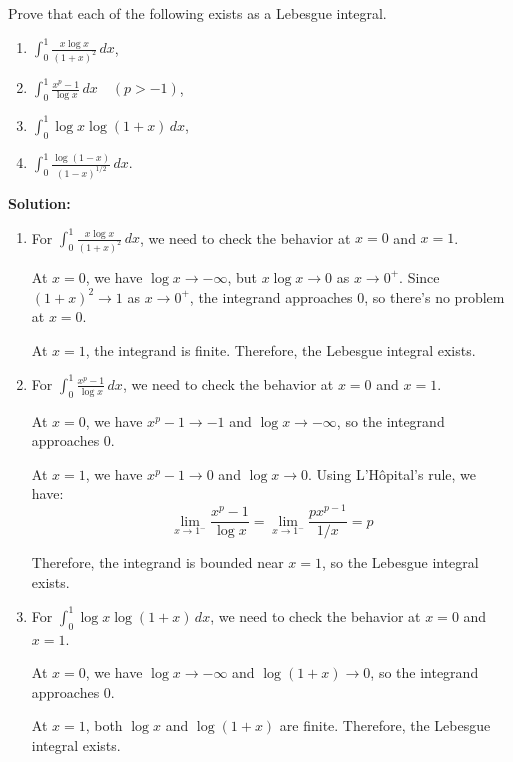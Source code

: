 \begin{problembox}
Prove that each of the following exists as a Lebesgue integral.
\begin{enumerate}[label=(\alph*)]
    \item $\int_{0}^{1} \frac{x \log x}{(1 + x)^2} \, dx$,
    \item $\int_{0}^{1} \frac{x^p - 1}{\log x} \, dx \quad (p > -1)$,
    \item $\int_{0}^{1} \log x \log (1 + x) \, dx$,
    \item $\int_{0}^{1} \frac{\log (1 - x)}{(1 - x)^{1/2}} \, dx.$
\end{enumerate}
\end{problembox}

\bigskip\noindent\textbf{Solution:}
\begin{enumerate}[label=(\alph*)]
    \item For $\int_{0}^{1} \frac{x \log x}{(1 + x)^2} \, dx$, we need to check the behavior at $x = 0$ and $x = 1$.
    
    At $x = 0$, we have $\log x \to -\infty$, but $x \log x \to 0$ as $x \to 0^+$. Since $(1 + x)^2 \to 1$ as $x \to 0^+$, the integrand approaches 0, so there's no problem at $x = 0$.
    
    At $x = 1$, the integrand is finite. Therefore, the Lebesgue integral exists.
    
    \item For $\int_{0}^{1} \frac{x^p - 1}{\log x} \, dx$, we need to check the behavior at $x = 0$ and $x = 1$.
    
    At $x = 0$, we have $x^p - 1 \to -1$ and $\log x \to -\infty$, so the integrand approaches 0.
    
    At $x = 1$, we have $x^p - 1 \to 0$ and $\log x \to 0$. Using L'Hôpital's rule, we have:
    \[\lim_{x \to 1^-} \frac{x^p - 1}{\log x} = \lim_{x \to 1^-} \frac{px^{p-1}}{1/x} = p\]
    
    Therefore, the integrand is bounded near $x = 1$, so the Lebesgue integral exists.
    
    \item For $\int_{0}^{1} \log x \log (1 + x) \, dx$, we need to check the behavior at $x = 0$ and $x = 1$.
    
    At $x = 0$, we have $\log x \to -\infty$ and $\log (1 + x) \to 0$, so the integrand approaches 0.
    
    At $x = 1$, both $\log x$ and $\log (1 + x)$ are finite. Therefore, the Lebesgue integral exists.
    

\end{enumerate}
